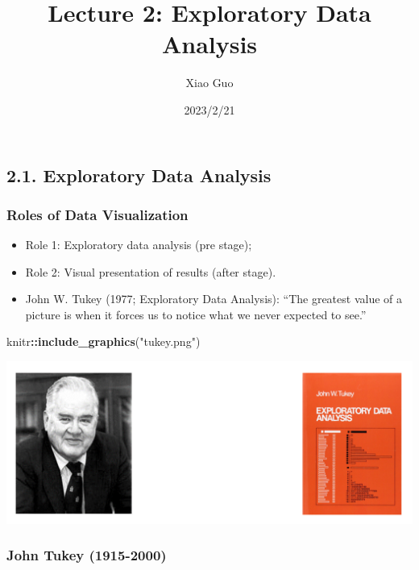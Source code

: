\documentclass[
]{article}
\title{Lecture 2: Exploratory Data Analysis}
\author{Xiao Guo}
\date{2023/2/21}
\newenvironment{Shaded}{\begin{snugshade}}{\end{snugshade}}
\newcommand{\KeywordTok}[1]{\textcolor[rgb]{0.13,0.29,0.53}{\textbf{#1}}}
\newcommand{\NormalTok}[1]{#1}
\newcommand{\OperatorTok}[1]{\textcolor[rgb]{0.81,0.36,0.00}{\textbf{#1}}}
\newcommand{\StringTok}[1]{\textcolor[rgb]{0.31,0.60,0.02}{#1}}
\providecommand{\tightlist}{%
  \setlength{\itemsep}{0pt}\setlength{\parskip}{0pt}}
\begin{document}
\maketitle

\hypertarget{exploratory-data-analysis}{%
\subsection{2.1. Exploratory Data
Analysis}\label{exploratory-data-analysis}}

\hypertarget{roles-of-data-visualization}{%
\subsubsection{Roles of Data
Visualization}\label{roles-of-data-visualization}}

\begin{itemize}
\tightlist
\item
  Role 1: Exploratory data analysis (pre stage);
\item
  Role 2: Visual presentation of results (after stage).
\item
  John W. Tukey (1977; Exploratory Data Analysis): ``The greatest value
  of a picture is when it forces us to notice what we never expected to
  see.''
\end{itemize}

\begin{Shaded}
\begin{Highlighting}[]
\NormalTok{knitr}\OperatorTok{::}\KeywordTok{include_graphics}\NormalTok{(}\StringTok{"tukey.png"}\NormalTok{)}
\end{Highlighting}
\end{Shaded}

\includegraphics{tukey.png}

\hypertarget{john-tukey-1915-2000}{%
\subsubsection{John Tukey (1915-2000)}\label{john-tukey-1915-2000}}
\end{document}
